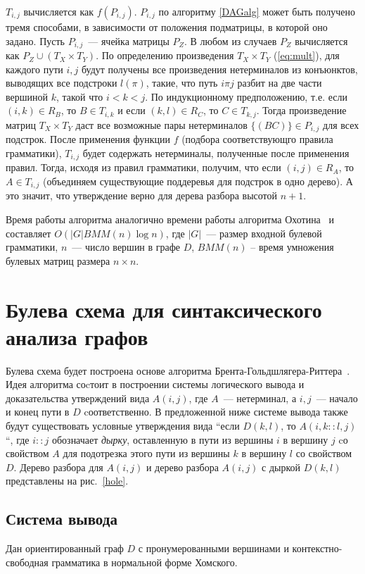 $T_{i,j}$
вычисляется как $f(P_{i,j})$. $P_{i,j}$ по алгоритму \ref{DAGalg} может быть получено
тремя способами, в зависимости от положения подматрицы, в
которой оно задано. Пусть $P_{i,j}$~--- ячейка матрицы $P_Z$. В любом из
случаев $P_Z$ вычисляется как $P_Z \cup (T_X \times T_Y)$. По определению
произведения $T_X \times T_Y$ (\ref{eq:mult}), для каждого пути $i, j$ будут получены все
произведения нетерминалов из конъюнктов, выводящих все
подстроки $l(\pi)$, такие, что путь $i \pi j$ разбит на две части вершиной
$k$, такой что $i < k < j$. По индукционному предположению, т.е. если $(i,k) \in R_B$, то $B \in T_{i,k}$ и если $(k,l) \in R_C$, то $C \in T_{k, j}$. Тогда
произведение матриц $T_X \times T_Y$ даст все возможные пары нетерминалов $\{(BC)\} \in P_{i,j}$ для всех подстрок. После применения функции $f$ (подбора соответствующго правила грамматики), $T_{i,j}$ будет содержать нетерминалы, полученные после применения правил. Тогда, исходя из правил грамматики, получим, что если $(i,j) \in R_A$, то $A \in T_{i, j}$ (объединяем существующие поддеревья для подстрок в одно дерево). А это значит, что утверждение верно для дерева разбора высотой $n + 1$.

Время работы алгоритма аналогично времени работы алгоритма
Охотина~\cite{OkhotinParse} и составляет $O(|G|BMM(n) \log n)$, где $|G|$~--- размер
входной булевой грамматики, $n$~--- число вершин в графе $D$,
$BMM(n)$ – время умножения булевых матриц размера $n \times n$.

\section {Булева схема для синтаксического анализа графов}
Булева схема будет построена основе алгоритма Брента-Гольдшлягера-Риттера~\cite{Brent}. Идея алгоритма соcтоит в построении системы логического вывода и доказательства утверждений вида $A(i, j)$, где $A$~--- нетерминал, а $i, j$~--- начало и конец пути в $D$ cоответственно. В предложенной ниже системе вывода также будут существовать условные утверждения вида ``если $D(k, l)$, то $A(i, k::l, j)$``, где $i::j$ обозначает \textit{дырку}, оставленную в пути из вершины $i$ в вершину $j$ cо свойством $A$ для подотрезка этого пути из вершины $k$ в вершину $l$ со свойством $D$. Дерево разбора для $A(i, j)$ и дерево разбора $A(i, j)$ с дыркой $D(k, l)$ представлены на рис.~\ref{hole}.

\subsection {Система вывода}
Дан ориентированный граф $D$ с пронумерованными вершинами и контекстно-свободная грамматика в нормальной форме Хомского.

